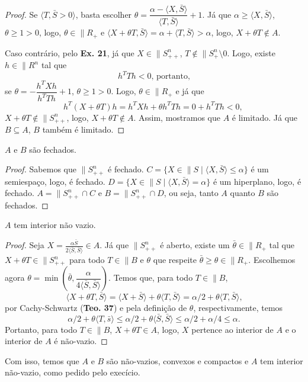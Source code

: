 \begin{homeworkProblemAnswer}
\begin{proof}
Se $\langle T, \bar{S} > 0 \rangle$, basta escolher $\theta = \dfrac{\alpha - \langle X, \bar{S} \rangle}{\langle T, \bar{S} \rangle} + 1$. Já que $\alpha \geq \langle X, \bar{S} \rangle$, $\theta \geq 1 > 0$, logo, $\theta \in \|{R}_+$ e $\langle X + \theta T, \bar{S} \rangle = \alpha + \langle T, \bar{S} \rangle > \alpha$, logo, $X + \theta T \notin A$.  

Caso contrário, pelo \textbf{Ex. 21}, já que $X \in \|{S}_{++}^n$, $T \notin \|{S}_+^n \setminus {0}$. Logo, existe $h \in \|{R}^n$ tal que
$$ h^TTh < 0 \text{, portanto,} $$
se $\theta = -\dfrac{h^TXh}{h^TTh} + 1$, $\theta \geq 1 > 0$. Logo, $\theta \in \|{R}_+$ e já que
$$ h^T(X+\theta T)h = h^TXh + \theta h^TTh = 0 + h^TTh < 0 \text{, } $$
$X + \theta T \notin \|{S}_{++}^n$, logo, $X + \theta T \notin A$. Assim, mostramos que $A$ é limitado. Já que $B \subseteq A$, $B$ também é limitado.
\end{proof}

\begin{prop}
$A$ e $B$ são fechados.
\end{prop}
\begin{proof}
Sabemos que $\|{S}_{++}^n$ é fechado. $C = \{X \in \|{S} \mid \langle X, \bar{S} \rangle \leq \alpha\}$ é um semiespaço, logo, é fechado. $D = \{X \in \|{S} \mid \langle X, \bar{S} \rangle = \alpha\}$ é um hiperplano, logo, é fechado. $A = \|{S}_{++}^n \cap C$ e $B = \|{S}_{++}^n \cap D$, ou seja, tanto $A$ quanto $B$ são fechados.
\end{proof}

\begin{prop}
$A$ tem interior não vazio.
\end{prop}
\begin{proof}
Seja $\displaystyle X = \frac{\alpha \bar{S}}{2 \langle \bar{S}, \bar{S} \rangle} \in A$. Já que $\|{S}_{++}^n$ é aberto, existe um $\bar{\theta} \in \|{R}_+$ tal que $X + \theta T \in \|{S}_{++}^n$ para todo $T \in \|{B}$ e $\theta$ que respeite $\bar{\theta} \geq \theta \in \|{R}_+$. Escolhemos agora $\theta = \min(\bar{\theta}, \dfrac{\alpha}{4\langle \bar{S}, \bar{S} \rangle})$. Temos que, para todo $T \in \|{B}$,
$$ \langle X + \theta T, \bar{S} \rangle = \langle X + \bar{S} \rangle + \theta \langle T, \bar{S} \rangle = \alpha/2 + \theta \langle T, \bar{S} \rangle \text{,} $$
por Cachy-Schwartz (\textbf{Teo. 37}) e pela definição de $\theta$, respectivamente, temos
$$ \alpha/2 + \theta \langle T, \bar{s} \rangle \leq \alpha/2 + \theta \langle \bar{S}, \bar{S} \rangle \leq \alpha/2 + \alpha/4 \leq \alpha \text{.}$$
Portanto, para todo $T \in \|{B}$, $X + \theta T \in A$, logo, $X$ pertence ao interior de $A$ e o interior de $A$ é não-vazio.
\end{proof}

Com isso, temos que $A$ e $B$ são não-vazios, convexos e compactos e $A$ tem interior não-vazio, como pedido pelo execício.
\end{homeworkProblemAnswer}

